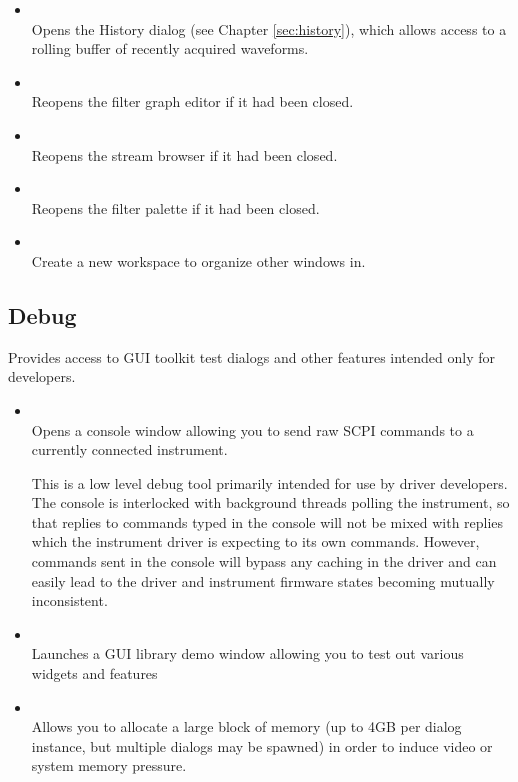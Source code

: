 \begin{itemize}
\item {}\\
Opens the History dialog (see Chapter \ref{sec:history}), which allows access to a rolling buffer of recently acquired
waveforms.

\item {}\\
Reopens the filter graph editor if it had been closed.

\item {}\\
Reopens the stream browser if it had been closed.

\item {}\\
Reopens the filter palette if it had been closed.

\item {}\\
Create a new workspace to organize other windows in.

\end{itemize}


\subsection{Debug}

Provides access to GUI toolkit test dialogs and other features intended only for developers.

\begin{itemize}

\item {}\\
Opens a console window allowing you to send raw SCPI commands to a currently connected instrument.

This is a low level debug tool primarily intended for use by driver developers. The console is interlocked with
background threads polling the instrument, so that replies to commands typed in the console will not be mixed with
replies which the instrument driver is expecting to its own commands. However, commands sent in the console will bypass
any caching in the driver and can easily lead to the driver and instrument firmware states becoming mutually
inconsistent.

\item {}\\

Launches a GUI library demo window allowing you to test out various widgets and features

\item {}\\

Allows you to allocate a large block of memory (up to 4GB per dialog instance, but multiple dialogs may be spawned) in
order to induce video or system memory pressure.

\end{itemize}

